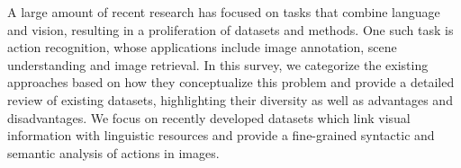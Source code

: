 A large amount of recent research has focused on tasks that combine language and vision, resulting in a proliferation of datasets and methods. One such task is action recognition, whose applications include image annotation, scene understanding and image retrieval. In this survey, we categorize the existing approaches based on how they conceptualize this problem and provide a detailed review of existing datasets, highlighting their diversity as well as advantages and disadvantages. We focus on recently developed datasets which link visual information with linguistic resources and provide a fine-grained syntactic and semantic analysis of actions in images.
